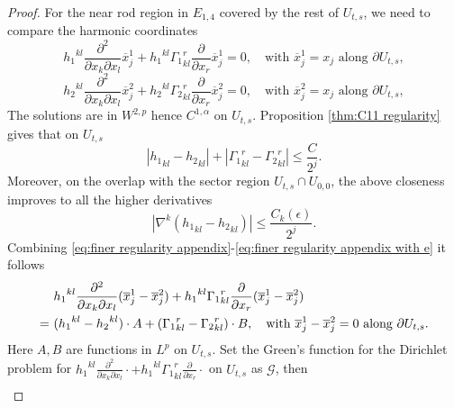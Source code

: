 \documentclass[a4paper,11pt]{amsart}
\theoremstyle{definition}
\numberwithin{equation}{section}
\begin{document}
\begin{proof}
    For the near rod region in $E_{1,4}$ covered by the rest of $U_{t,s}$, we need to compare the harmonic coordinates 
    \begin{equation}
        {h_1}^{kl}\frac{\partial^2}{\partial x_k\partial x_l}\overline{x}_j^1+{h_1}^{kl}{\Gamma_1}^r_{kl}\frac{\partial}{\partial x_r}\overline{x}_j^1=0,\quad \text{with }\overline{x}_j^1=x_j\text{ along }\partial U_{t,s},\label{eq:harmonic coordinates for h1 appendix}
    \end{equation}
    \begin{equation}
        {h_2}^{kl}\frac{\partial^2}{\partial x_k\partial x_l}\overline{x}_j^2+{h_2}^{kl}{\Gamma_2}^r_{kl}\frac{\partial}{\partial x_r}\overline{x}_j^2=0,\quad \text{with }\overline{x}_j^2=x_j\text{ along }\partial U_{t,s},
    \end{equation}
   The solutions are in $W^{2,p}$ hence $C^{1,\alpha}$ on $U_{t,s}$.
    Proposition \ref{thm:C11 regularity} gives that on $U_{t,s}$
    \begin{equation}\label{eq:finer regularity appendix}
        |{h_1}_{kl}-{h_2}_{kl}|+|{\Gamma_1}^r_{kl}-{\Gamma_2}^r_{kl}|\leq \frac{C}{2^j}.
    \end{equation}
    Moreover, on the overlap with the sector region $U_{t,s}\cap U_{0,0}$, the above closeness improves to all the higher derivatives
    \begin{equation}\label{eq:finer regularity appendix with e}
        |\nabla^k({h_1}_{kl}-{h_2}_{kl})|\leq \frac{C_k(\epsilon)}{2^j}.
    \end{equation}
    Combining \eqref{eq:finer regularity appendix}-\eqref{eq:finer regularity appendix with e} it follows
    \begin{align}\label{eq:elliptic equation for difference of harmonic coordinates appendix}
        &{h_1}^{kl}\frac{\partial^2}{\partial x_k\partial x_l}(\overline{x}_j^1-\overline{x}_j^2)+{h_1}^{kl}{\Gamma_1}^r_{kl}\frac{\partial}{\partial x_r}(\overline{x}_j^1-\overline{x}_j^2)\\
        =\ &({h_1}^{kl}-{h_2}^{kl})\cdot A+({\Gamma_1}^{r}_{kl}-{\Gamma_2}^{r}_{kl})\cdot B,\quad \text{with }\overline{x}_j^1-\overline{x}_j^2=0\text{ along }\partial U_{t,s}. \notag
    \end{align}
    Here $A,B$ are functions in $L^p$ on $U_{t,s}$. Set the Green's function for the Dirichlet problem for ${h_1}^{kl}\frac{\partial^2}{\partial x_k\partial x_l}\cdot+{h_1}^{kl}{\Gamma_1}^r_{kl}\frac{\partial}{\partial x_r}\cdot$ on $U_{t,s}$ as $\mathcal{G}$, then 
    \begin{align}

\end{align}
\end{proof}
\end{document}

